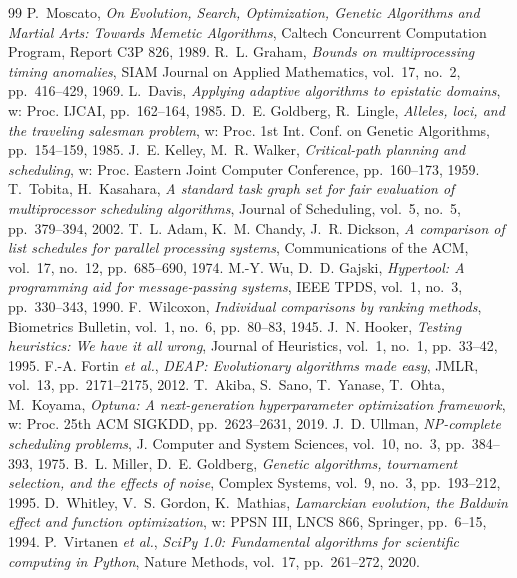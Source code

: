 \documentclass[pdflatex,sn-mathphys,Numbered]{sn-jnl}
\begin{document}
\begin{thebibliography}{99}
 P.~Moscato, \textit{On Evolution, Search, Optimization, Genetic Algorithms and Martial Arts: Towards Memetic Algorithms}, Caltech Concurrent Computation Program, Report C3P 826, 1989.
 R.~L. Graham, \textit{Bounds on multiprocessing timing anomalies}, SIAM Journal on Applied Mathematics, vol.~17, no.~2, pp.~416--429, 1969.
 L.~Davis, \textit{Applying adaptive algorithms to epistatic domains}, w: Proc. IJCAI, pp.~162--164, 1985.
 D.~E. Goldberg, R.~Lingle, \textit{Alleles, loci, and the traveling salesman problem}, w: Proc. 1st Int. Conf. on Genetic Algorithms, pp.~154--159, 1985.
 J.~E. Kelley, M.~R. Walker, \textit{Critical-path planning and scheduling}, w: Proc. Eastern Joint Computer Conference, pp.~160--173, 1959.
 T.~Tobita, H.~Kasahara, \textit{A standard task graph set for fair evaluation of multiprocessor scheduling algorithms}, Journal of Scheduling, vol.~5, no.~5, pp.~379--394, 2002.
 T.~L. Adam, K.~M. Chandy, J.~R. Dickson, \textit{A comparison of list schedules for parallel processing systems}, Communications of the ACM, vol.~17, no.~12, pp.~685--690, 1974.
 M.-Y. Wu, D.~D. Gajski, \textit{Hypertool: A programming aid for message-passing systems}, IEEE TPDS, vol.~1, no.~3, pp.~330--343, 1990.
 F.~Wilcoxon, \textit{Individual comparisons by ranking methods}, Biometrics Bulletin, vol.~1, no.~6, pp.~80--83, 1945.
 J.~N. Hooker, \textit{Testing heuristics: We have it all wrong}, Journal of Heuristics, vol.~1, no.~1, pp.~33--42, 1995.
 F.-A. Fortin \textit{et al.}, \textit{DEAP: Evolutionary algorithms made easy}, JMLR, vol.~13, pp.~2171--2175, 2012.
 T.~Akiba, S.~Sano, T.~Yanase, T.~Ohta, M.~Koyama, \textit{Optuna: A next-generation hyperparameter optimization framework}, w: Proc. 25th ACM SIGKDD, pp.~2623--2631, 2019.
 J.~D. Ullman, \textit{NP-complete scheduling problems}, J. Computer and System Sciences, vol.~10, no.~3, pp.~384--393, 1975.
 B.~L. Miller, D.~E. Goldberg, \textit{Genetic algorithms, tournament selection, and the effects of noise}, Complex Systems, vol.~9, no.~3, pp.~193--212, 1995.
 D.~Whitley, V.~S. Gordon, K.~Mathias, \textit{Lamarckian evolution, the Baldwin effect and function optimization}, w: PPSN III, LNCS 866, Springer, pp.~6--15, 1994.
 P.~Virtanen \textit{et al.}, \textit{SciPy 1.0: Fundamental algorithms for scientific computing in Python}, Nature Methods, vol.~17, pp.~261--272, 2020.

\end{thebibliography}
\end{document}
